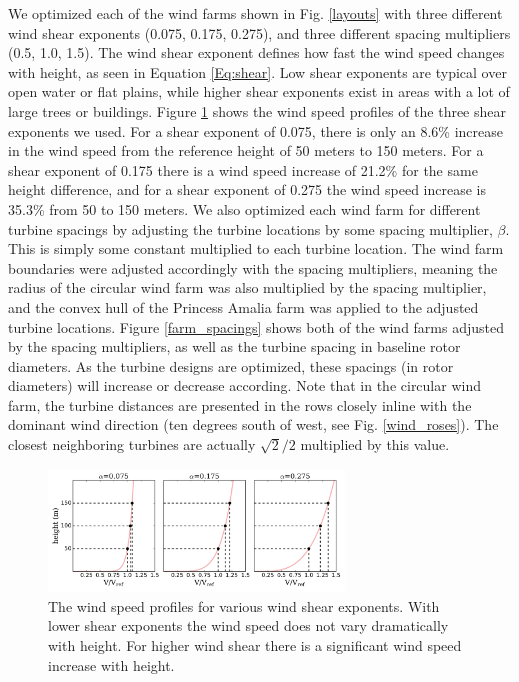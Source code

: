 We optimized each of the wind farms shown in Fig. \ref{layouts} with three different wind shear exponents (0.075, 0.175, 0.275), and three different spacing multipliers (0.5, 1.0, 1.5). The wind shear exponent defines how fast the wind speed changes with height, as seen in Equation \ref{Eq:shear}. Low shear exponents are typical over open water or flat plains, while higher shear exponents exist in areas with a lot of large trees or buildings. Figure \ref{shear_profile} shows the wind speed profiles of the three shear exponents we used. For a shear exponent of 0.075, there is only an 8.6\% increase in the wind speed from the reference height of 50 meters to 150 meters. For a shear exponent of 0.175 there is a wind speed increase of 21.2\% for the same height difference, and for a shear exponent of 0.275 the wind speed increase is 35.3\% from 50 to 150 meters. We also optimized each wind farm for different turbine spacings by adjusting the turbine locations by some spacing multiplier, $\beta$.  This is simply some constant multiplied to each turbine location. The wind farm boundaries were adjusted accordingly with the spacing multipliers, meaning the radius of the circular wind farm was also multiplied by the spacing multiplier, and the convex hull of the Princess Amalia farm was applied to the adjusted turbine locations. Figure \ref{farm_spacings} shows both of the wind farms adjusted by the spacing multipliers, as well as the turbine spacing in baseline rotor diameters. As the turbine designs are optimized, these spacings (in rotor diameters) will increase or decrease according. Note that in the circular wind farm, the turbine distances are presented in the rows closely inline with the dominant wind direction (ten degrees south of west, see Fig. \ref{wind_roses}). The closest neighboring turbines are actually $\sqrt{2}/2$ multiplied by this value. 


\begin{figure}[htbp]
  \centering
  \includegraphics[width=0.7\textwidth]{Figures/shears.pdf}
  \caption{\label{shear_profile}The wind speed profiles for various wind shear exponents. With lower shear exponents the wind speed does not vary dramatically with height. For higher wind shear there is a significant wind speed increase with height.}
\end{figure}

